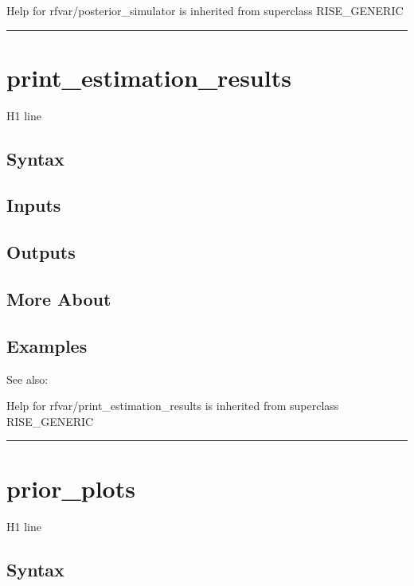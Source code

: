\documentclass[letterpaper,10pt,english]{sphinxmanual}
\begin{document}
Help for rfvar/posterior\_simulator is inherited from superclass RISE\_GENERIC


\bigskip\hrule{}\bigskip



\section{print\_estimation\_results}
\label{classes/models/@rfvar/rfvar:print-estimation-results}\label{classes/models/@rfvar/rfvar:id104}
H1 line


\subsection{Syntax}
\label{classes/models/@rfvar/rfvar:id105}

\subsection{Inputs}
\label{classes/models/@rfvar/rfvar:id106}

\subsection{Outputs}
\label{classes/models/@rfvar/rfvar:id107}

\subsection{More About}
\label{classes/models/@rfvar/rfvar:id108}

\subsection{Examples}
\label{classes/models/@rfvar/rfvar:id109}
See also:

Help for rfvar/print\_estimation\_results is inherited from superclass RISE\_GENERIC


\bigskip\hrule{}\bigskip



\section{prior\_plots}
\label{classes/models/@rfvar/rfvar:id110}\label{classes/models/@rfvar/rfvar:prior-plots}
H1 line


\subsection{Syntax}
\label{classes/models/@rfvar/rfvar:id111}
\end{document}
